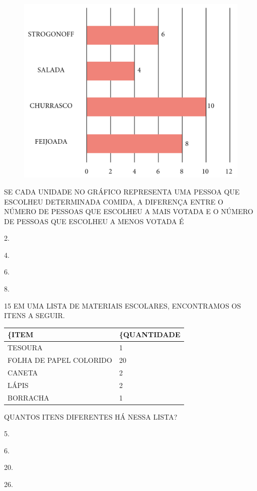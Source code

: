 \begin{figure}[htpb!]
\centering
\includegraphics[width=.8\textwidth]{./media/SAEB_1ANO_MAT_FIGURA141.png}
\end{figure}

\pagebreak
SE CADA UNIDADE NO GRÁFICO REPRESENTA UMA PESSOA QUE ESCOLHEU DETERMINADA COMIDA,
A DIFERENÇA ENTRE O NÚMERO DE PESSOAS QUE ESCOLHEU A MAIS VOTADA E O NÚMERO DE
PESSOAS QUE ESCOLHEU A MENOS VOTADA É

\begin{escolha}[itemsep=0pt]
\item 2.

\item 4.

\item 6.

\item 8.
\end{escolha}


\num{15} EM UMA LISTA DE MATERIAIS ESCOLARES, ENCONTRAMOS OS ITENS A SEGUIR.


\begin{table}[!ht]
    \centering
    \begin{tabular}{|l|l|}
    \hline
        \textbf\{ITEM} & \textbf\{QUANTIDADE} \\ \hline
        TESOURA & 1 \\ \hline
        FOLHA DE PAPEL COLORIDO & 20 \\ \hline
        CANETA & 2 \\ \hline
        LÁPIS & 2 \\ \hline
        BORRACHA & 1 \\ \hline
    \end{tabular}
\end{table}

QUANTOS ITENS DIFERENTES HÁ NESSA LISTA?

\begin{escolha}[itemsep=0pt]
\item 5.

\item 6.

\item 20.

\item 26.
\end{escolha}